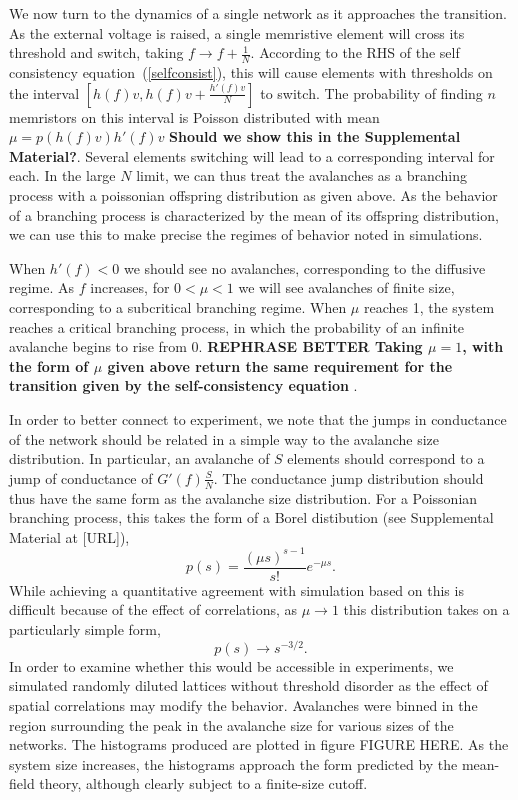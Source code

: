 \documentclass[aps,prl,reprint,groupedaddress]{revtex4-1}
\begin{document}
We now turn to the dynamics of a single network as it approaches the
transition.  As the external voltage is raised, a single memristive element
will cross its threshold and switch, taking $f\to f + \frac{1}{N}$.
According to the RHS of the self consistency equation~(\ref{selfconsist}),
this will cause
elements with thresholds on the interval $[h(f)v, h(f)v + \frac{h'(f)v}{N}]$
to switch.  The probability of finding $n$ memristors on this interval is
Poisson distributed with mean $\mu = p(h(f)v)h'(f)v$ {\bf Should we show this in the Supplemental Material?}. Several elements
switching will lead to a corresponding interval for each. In the large $N$
limit, we can thus treat the avalanches as a branching process with a
poissonian offspring distribution as given above.  As the behavior of a
branching process is characterized by the mean of its offspring distribution,
we can use this to make precise the regimes of behavior noted in simulations.

When $h'(f)<0$ we should see no avalanches, corresponding to the diffusive
regime.  As $f$ increases, for $0<\mu < 1$ we will see avalanches of finite
size, corresponding to a subcritical branching regime.  When $\mu$ reaches 1,
the system reaches a critical branching process, in which the probability of
an infinite avalanche begins to rise from 0. {\bf REPHRASE BETTER Taking $\mu=1$, with the form of
$\mu$ given above return the same requirement for the transition given by the
self-consistency equation }.

In order to better connect to
experiment, we note that the jumps in conductance of the network should be 
related in a simple way to the avalanche size distribution.  In particular,
an avalanche of $S$ elements should correspond to a jump of conductance of
$G'(f)\frac{S}{N}$.  The conductance jump distribution should thus have the
same form as the avalanche size distribution. For a Poissonian branching
process, this takes the form of a Borel distibution
(see Supplemental Material at [URL]),
\begin{equation}
p(s) = \frac{(\mu s)^{s-1}}{s!}e^{-\mu s}.
\end{equation}
While achieving a quantitative agreement with simulation based on this is
difficult because of the effect of correlations,
as $\mu\to 1$ this distribution takes on a particularly simple form,
\begin{equation}
p(s) \to s^{-3/2}.
\end{equation}
In order to examine whether this would be accessible in experiments, we
simulated randomly diluted lattices without threshold disorder as the
effect of spatial correlations may modify the behavior.  Avalanches were
binned in the region surrounding the peak in the avalanche size for
various sizes of the networks. The histograms produced are plotted in
figure FIGURE HERE. As the system size increases, the histograms approach
the form predicted by the mean-field theory, although clearly subject to a finite-size
cutoff.
\end{document}
